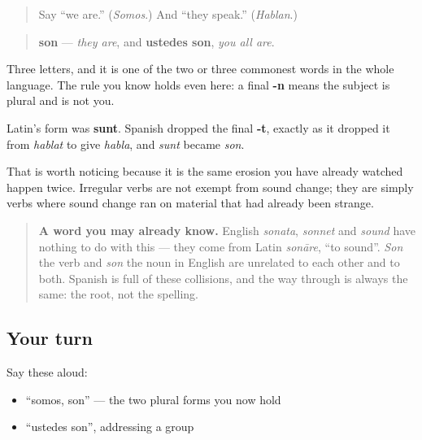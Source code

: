 \label{lesson:ES-C09-son}



\begin{quote}
Say \textquotedblleft{}we are.\textquotedblright{} (\emph{Somos}.) And \textquotedblleft{}they speak.\textquotedblright{} (\emph{Hablan}.)
\end{quote}

\begin{grammarlens}[title={Grammar Lens: the final -n, again}]
\begin{quote}
\textbf{son} — \emph{they are}, and \textbf{ustedes son}, \emph{you all are}.
\end{quote}

Three letters, and it is one of the two or three commonest words in the whole language. The rule you know holds even here: a final \textbf{-n} means the subject is plural and is not you.
\end{grammarlens}

\begin{cousinweb}
Latin's form was \textbf{sunt}. Spanish dropped the final \textbf{-t}, exactly as it dropped it from \emph{hablat} to give \emph{habla}, and \emph{sunt} became \emph{son}.

That is worth noticing because it is the same erosion you have already watched happen twice. Irregular verbs are not exempt from sound change; they are simply verbs where sound change ran on material that had already been strange.

\begin{quote}
\textbf{A word you may already know.} English \emph{sonata}, \emph{sonnet} and \emph{sound} have nothing to do with this — they come from Latin \emph{sonāre}, \textquotedblleft{}to sound\textquotedblright{}. \emph{Son} the verb and \emph{son} the noun in English are unrelated to each other and to both. Spanish is full of these collisions, and the way through is always the same: the root, not the spelling.
\end{quote}
\end{cousinweb}

\subsection*{Your turn}
Say these aloud:

\begin{itemize}
\raggedright
  \item \textquotedblleft{}somos, son\textquotedblright{} — the two plural forms you now hold
  \item \textquotedblleft{}ustedes son\textquotedblright{}, addressing a group
\end{itemize}


